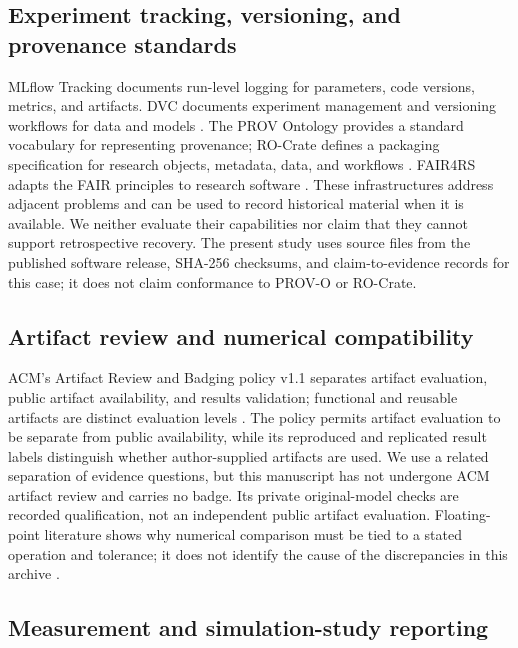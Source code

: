 \documentclass[12pt,a4paper]{article}
\begin{document}
\subsection{Experiment tracking, versioning, and provenance standards}

MLflow Tracking documents run-level logging for parameters, code versions, metrics, and artifacts. DVC documents experiment management and versioning workflows for data and models \cite{R19,R20}. The PROV Ontology provides a standard vocabulary for representing provenance; RO-Crate defines a packaging specification for research objects, metadata, data, and workflows \cite{R17,R18}. FAIR4RS adapts the FAIR principles to research software \cite{R6,R7}. These infrastructures address adjacent problems and can be used to record historical material when it is available. We neither evaluate their capabilities nor claim that they cannot support retrospective recovery. The present study uses source files from the published software release, SHA-256 checksums, and claim-to-evidence records for this case; it does not claim conformance to PROV-O or RO-Crate.

\subsection{Artifact review and numerical compatibility}

ACM's Artifact Review and Badging policy v1.1 separates artifact evaluation, public artifact availability, and results validation; functional and reusable artifacts are distinct evaluation levels \cite{R16}. The policy permits artifact evaluation to be separate from public availability, while its reproduced and replicated result labels distinguish whether author-supplied artifacts are used. We use a related separation of evidence questions, but this manuscript has not undergone ACM artifact review and carries no badge. Its private original-model checks are recorded qualification, not an independent public artifact evaluation. Floating-point literature shows why numerical comparison must be tied to a stated operation and tolerance; it does not identify the cause of the discrepancies in this archive \cite{R2,R13}.

\subsection{Measurement and simulation-study reporting}
\end{document}

